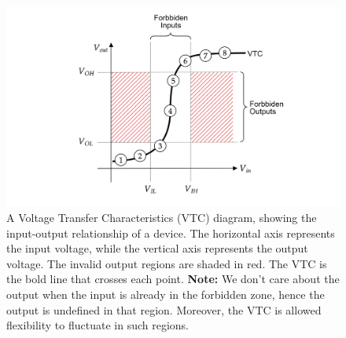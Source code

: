     \begin{figure}[ht!]

        \centering
        \includegraphics[width=\textwidth]{./Sections/circuits/vtc.png}
        \caption{A Voltage Transfer Characteristics (VTC) diagram, showing the input-output relationship of a device. 
        The horizontal axis represents the input voltage, while the vertical axis represents the output voltage. 
        The invalid output regions are shaded in red. The VTC is the bold line that crosses each point. \textbf{Note:} We don't care about the output when the input 
        is already in the forbidden zone, hence the output is undefined in that region. Moreover, the VTC is allowed flexibility
        to fluctuate in such regions.}
        \label{fig:vtc}
    \end{figure}